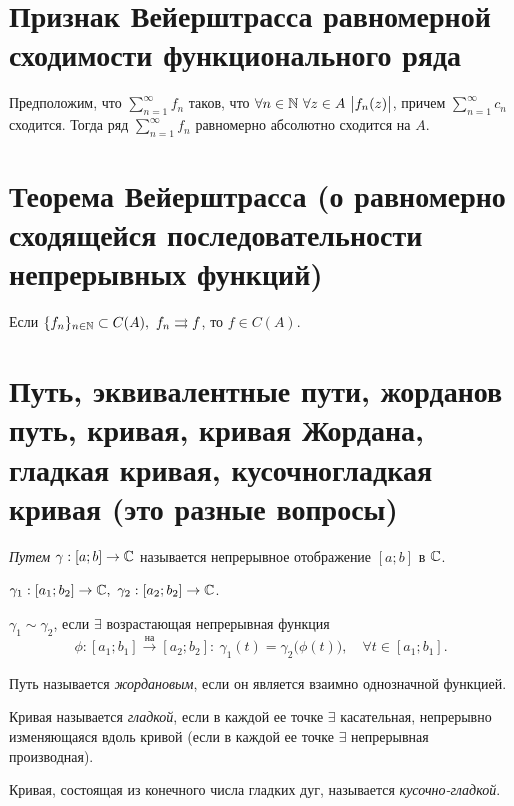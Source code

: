 \section{Признак Вейерштрасса равномерной сходимости функционального ряда}

\begin{note}
	Предположим, что $\sum_{n=1}^{\infty}f_n$ таков, что $\forall n \in \mathbb{N} \ \forall z \in A \ \big|f_n(z)\big|$, причем $\sum_{n=1}^{\infty}c_n$ сходится. Тогда ряд $\sum_{n=1}^{\infty}f_n$ равномерно абсолютно сходится на $A$.
\end{note}

\section{Теорема Вейерштрасса (о равномерно сходящейся последовательности непрерывных функций)}

\begin{theorem}
	Если $\{f_n\}_{n \in \N} \subset C(A), \ f_n \rightrightarrows f$, то $f \in C(A)$.
\end{theorem}

\section{Путь, эквивалентные пути, жорданов путь, кривая, кривая Жордана, гладкая кривая, кусочногладкая кривая (это разные вопросы)}

\begin{definition}[Путь]
	\emph{Путем} $\gamma:[a ; b]\rightarrow \mathbb{C}$ называется непрерывное отображение $[a ; b]$ в $\mathbb{C}$.
\end{definition}

\begin{definition}
	$\gamma_1:[a_1 ; b_2] \rightarrow \C, \ \gamma_2:[a_2 ; b_2] \rightarrow \C$.

	$\gamma_1 \sim \gamma_2$, если $\exists $ возрастающая непрерывная функция
	\[
		\phi:[a_1 ; b_1] \xrightarrow[]{\text{на}} [a_2 ; b_2]: \ \gamma_1 (t) = \gamma_2 \big(\phi(t)\big), \quad \forall t \in [a_1 ; b_1].
	\]
\end{definition}

\begin{definition}
	Путь называется \emph{жордановым}, если он является взаимно однозначной функцией.
\end{definition}

\begin{definition}
	Кривая называется \emph{гладкой}, если в каждой ее точке $\exists $ касательная, непрерывно изменяющаяся вдоль кривой (если в каждой ее точке $\exists $ непрерывная производная).
\end{definition}

\begin{definition}
	Кривая, состоящая из конечного числа гладких дуг, называется \emph{кусочно-гладкой}.
\end{definition}
